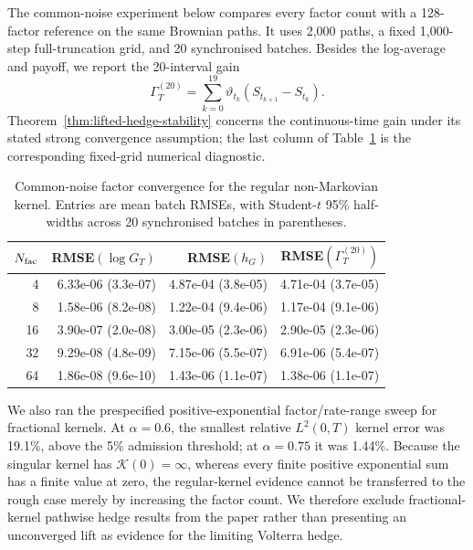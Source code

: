 \documentclass[10pt,a4paper,reqno]{amsart}
\theoremstyle{plain}
\theoremstyle{definition}
\theoremstyle{remark}
\theoremstyle{example}
\begin{document}
The common-noise experiment below compares every factor count with a 128-factor reference on the same
Brownian paths.  It uses 2,000 paths, a fixed 1,000-step full-truncation grid, and 20 synchronised
batches.  Besides the log-average and payoff, we report the 20-interval gain
\[
 \Gamma_T^{(20)}=\sum_{k=0}^{19}\vartheta_{t_k}
                 (S_{t_{k+1}}-S_{t_k}).
\]
Theorem~\ref{thm:lifted-hedge-stability} concerns the continuous-time gain under its stated strong
convergence assumption; the last column of Table~\ref{tab:regular-kernel-pathwise} is the
corresponding fixed-grid numerical diagnostic.

\begin{table}[htbp]
\centering
\small
 \begin{tabular}{rrrr}
\toprule
 \(N_{\rm fac}\) &  RMSE\((\log G_T)\) &  RMSE\((h_G)\) &  RMSE\((\Gamma_T^{(20)})\) \\
\midrule
4 & 6.33e-06 (3.3e-07) & 4.87e-04 (3.8e-05) & 4.71e-04 (3.7e-05) \\
8 & 1.58e-06 (8.2e-08) & 1.22e-04 (9.4e-06) & 1.17e-04 (9.1e-06) \\
16 & 3.90e-07 (2.0e-08) & 3.00e-05 (2.3e-06) & 2.90e-05 (2.3e-06) \\
32 & 9.29e-08 (4.8e-09) & 7.15e-06 (5.5e-07) & 6.91e-06 (5.4e-07) \\
64 & 1.86e-08 (9.6e-10) & 1.43e-06 (1.1e-07) & 1.38e-06 (1.1e-07) \\
\bottomrule
\end{tabular}
\caption{ Common-noise factor convergence for the  regular non-Markovian kernel.  Entries are mean
batch RMSEs,  with Student-\(t\) 95\% half-widths across 20 synchronised batches in parentheses. }
 \label{tab:regular-kernel-pathwise}
\end{table}

 We also ran the prespecified positive-exponential factor/rate-range sweep for fractional kernels.
At \(\alpha=0.6\), the smallest relative \(L^2(0,T)\) kernel error was 19.1\%, above the 5\%
admission threshold; at \(\alpha=0.75\) it was 1.44\%.  Because the singular kernel has
\(\mathcal K(0)=\infty\), whereas every finite positive exponential sum has a finite value at zero,
the regular-kernel evidence cannot be transferred to the rough case merely by increasing the
factor count.  We therefore exclude fractional-kernel pathwise hedge results from the paper rather
than presenting an unconverged lift as evidence for the limiting Volterra hedge.
\end{document}
